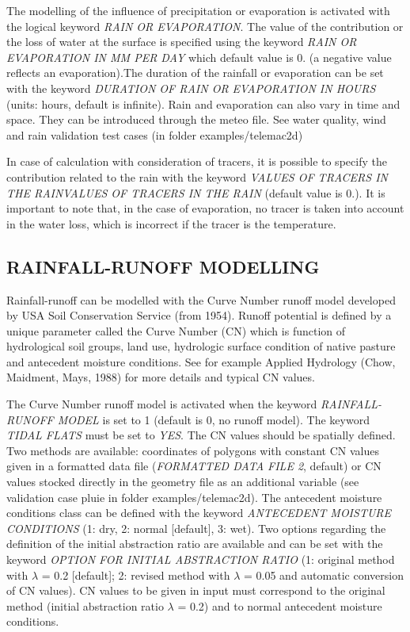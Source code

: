  The modelling of the influence of precipitation or evaporation is activated with the logical keyword \textit{RAIN OR EVAPORATION}. The value of the contribution or the loss of water at the surface is specified using the keyword \textit{RAIN OR EVAPORATION IN MM PER DAY} which default value is 0. (a negative value reflects an evaporation).The duration of the rainfall or evaporation can be set with the keyword \textit{DURATION OF RAIN OR EVAPORATION IN HOURS} (units: hours, default is infinite). Rain and evaporation can also vary in time and space. They can be introduced through the meteo file. See water quality, wind and rain validation test cases (in folder examples/telemac2d)

 In case of calculation with consideration of tracers, it is possible to specify the contribution related to the rain with the keyword \textit{VALUES OF TRACERS IN THE RAINVALUES OF TRACERS IN THE RAIN} (default value is 0.). It is important to note that, in the case of evaporation, no tracer is taken into account in the water loss, which is incorrect if the tracer is the temperature.

\subsection{RAINFALL-RUNOFF MODELLING}

Rainfall-runoff can be modelled with the Curve Number runoff model developed by USA Soil Conservation Service (from 1954). Runoff potential is defined by a unique parameter called the Curve Number (CN) which is function of hydrological soil groups, land use, hydrologic surface condition of native pasture and antecedent moisture conditions. See for example Applied Hydrology (Chow, Maidment, Mays, 1988) for more details and typical CN values.

The Curve Number runoff model is activated when the keyword \textit{RAINFALL-RUNOFF MODEL} is set to 1 (default is 0, no runoff model). The keyword \textit{TIDAL FLATS} must be set to \textit{YES}. The CN values should be spatially defined. Two methods are available: coordinates of polygons with constant CN values given in a formatted data file (\textit{FORMATTED DATA FILE 2}, default) or CN values stocked directly in the geometry file as an additional variable (see validation case pluie in folder examples/telemac2d). The antecedent moisture conditions class can be defined with the keyword \textit{ANTECEDENT MOISTURE CONDITIONS} (1: dry, 2: normal [default], 3: wet). Two options regarding the definition of the initial abstraction ratio are available and can be set with the keyword \textit{OPTION FOR INITIAL ABSTRACTION RATIO} (1: original method with $\lambda$ = 0.2 [default]; 2: revised method with $\lambda$ = 0.05 and automatic conversion of CN values). CN values to be given in input must correspond to the original method (initial abstraction ratio $\lambda$ = 0.2) and to normal antecedent moisture conditions.

